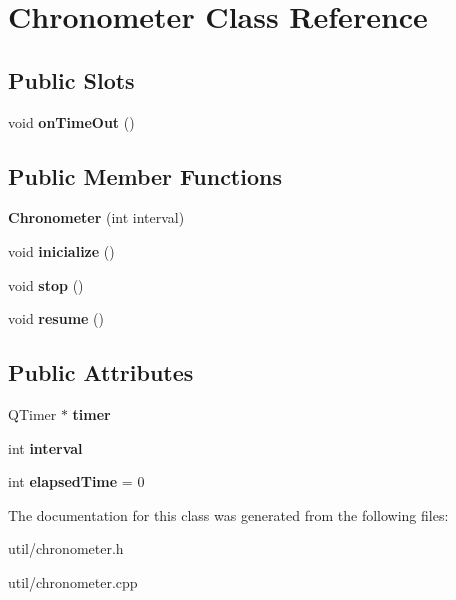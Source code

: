 \hypertarget{classChronometer}{}\section{Chronometer Class Reference}
\label{classChronometer}
\subsection*{Public Slots}
\begin{DoxyCompactItemize}
\item 
\mbox{\label{classChronometer_a3249ca63492707055c4372358faff516}} 
void {\bfseries on\+Time\+Out} ()
\end{DoxyCompactItemize}
\subsection*{Public Member Functions}
\begin{DoxyCompactItemize}
\item 
\mbox{\label{classChronometer_a48586cec8b1785fad325f46110567896}} 
{\bfseries Chronometer} (int interval)
\item 
\mbox{\label{classChronometer_a27f3301f6f90f2c312e351280f7c93f6}} 
void {\bfseries inicialize} ()
\item 
\mbox{\label{classChronometer_a3d3e42c2d8322932967dacd8fb2de1c3}} 
void {\bfseries stop} ()
\item 
\mbox{\label{classChronometer_ac98118472c0cc0691d9891e1173f86a9}} 
void {\bfseries resume} ()
\end{DoxyCompactItemize}
\subsection*{Public Attributes}
\begin{DoxyCompactItemize}
\item 
\mbox{\label{classChronometer_a3ecf89b8da00ccd177d454150ee5bf62}} 
Q\+Timer $\ast$ {\bfseries timer}
\item 
\mbox{\label{classChronometer_a71939a385eb2bc77b7761185b83af2a8}} 
int {\bfseries interval}
\item 
\mbox{\label{classChronometer_ae197f19fd9e489e651a26928dc4f9edf}} 
int {\bfseries elapsed\+Time} = 0
\end{DoxyCompactItemize}


The documentation for this class was generated from the following files\+:\begin{DoxyCompactItemize}
\item 
util/chronometer.\+h\item 
util/chronometer.\+cpp\end{DoxyCompactItemize}
